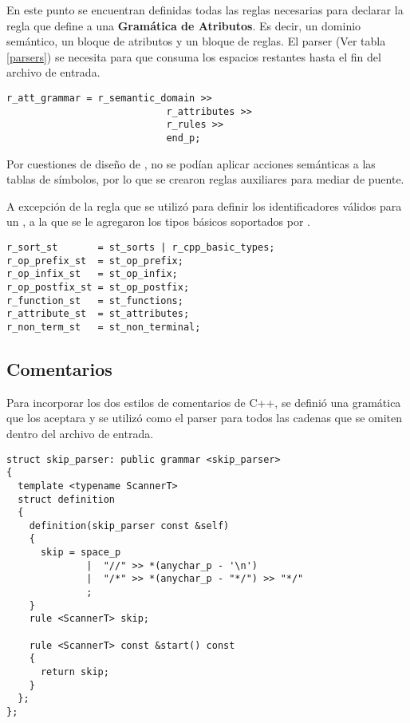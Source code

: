 En este punto se encuentran definidas todas las reglas necesarias para declarar la regla que define a una \textbf{Gramática de Atributos}. Es decir, un dominio semántico, un bloque de atributos y un bloque de reglas. El parser  (Ver tabla \ref{parsers}) se necesita para que consuma los espacios restantes hasta el fin del archivo de entrada.

\begin{lstlisting}[columns=fullflexible, linewidth=7cm]
r_att_grammar = r_semantic_domain >>
                            r_attributes >>
                            r_rules >>
                            end_p;
\end{lstlisting}

Por cuestiones de diseño de \spirit, no se podían aplicar acciones semánticas a las tablas de símbolos, por lo que se crearon reglas auxiliares para mediar de puente.

A excepción de la regla que se utilizó para definir los identificadores válidos para un , a la que se le agregaron los tipos básicos soportados por \maggen.

\begin{lstlisting}[linewidth=9.5cm]
r_sort_st       = st_sorts | r_cpp_basic_types;
r_op_prefix_st  = st_op_prefix;
r_op_infix_st   = st_op_infix;
r_op_postfix_st = st_op_postfix;
r_function_st   = st_functions;
r_attribute_st  = st_attributes;
r_non_term_st   = st_non_terminal;
\end{lstlisting}

\subsection{Comentarios}

Para incorporar los dos estilos de comentarios de C++, se definió una gramática que los aceptara y se utilizó como el parser para todos las cadenas que se omiten dentro del archivo de entrada.

\begin{lstlisting}[columns=fullflexible, linewidth=9cm]
struct skip_parser: public grammar <skip_parser>
{
  template <typename ScannerT>
  struct definition
  {
    definition(skip_parser const &self)
    {
      skip = space_p
              |  "//" >> *(anychar_p - '\n')
              |  "/*" >> *(anychar_p - "*/") >> "*/"
              ;
    }
    rule <ScannerT> skip;

    rule <ScannerT> const &start() const
    {
      return skip;
    }
  };
};
\end{lstlisting}

